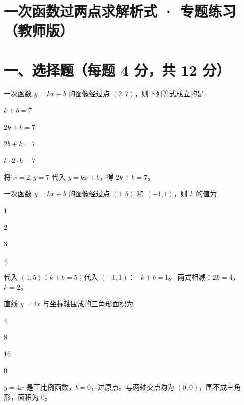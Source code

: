\documentclass{exam-zh}
\begin{document}
\section*{一次函数过两点求解析式 · 专题练习（教师版）}

\section*{一、选择题（每题 4 分，共 12 分）}


\begin{question}[points=4]
  一次函数 $y = kx + b$ 的图像经过点 $(2, 7)$，则下列等式成立的是
  \begin{choices}
    \item $k + b = 7$
    \item $2k + b = 7$
    \item $2b + k = 7$
    \item $k \cdot 2 \cdot b = 7$
  \end{choices}
  \paren[B]
  \begin{solutionblock}
    将 $x = 2, y = 7$ 代入 $y = kx + b$，得 $2k + b = 7$。
  \end{solutionblock}
\end{question}



\begin{question}[points=4]
  一次函数 $y = kx + b$ 的图像经过点 $(1, 5)$ 和 $(-1, 1)$，则 $k$ 的值为
  \begin{choices}
    \item $1$
    \item $2$
    \item $3$
    \item $4$
  \end{choices}
  \paren[B]
  \begin{solutionblock}
    代入 $(1,5)$：$k + b = 5$；代入 $(-1,1)$：$-k + b = 1$。
两式相减：$2k = 4$，$k = 2$。

  \end{solutionblock}
\end{question}



\begin{question}[points=4]
  直线 $y = 4x$ 与坐标轴围成的三角形面积为
  \begin{choices}
    \item $4$
    \item $8$
    \item $16$
    \item $0$
  \end{choices}
  \paren[D]
  \begin{solutionblock}
    $y = 4x$ 是正比例函数，$b = 0$，过原点。与两轴交点均为 $(0,0)$，围不成三角形，面积为 $0$。
  \end{solutionblock}
\end{question}
\end{document}
